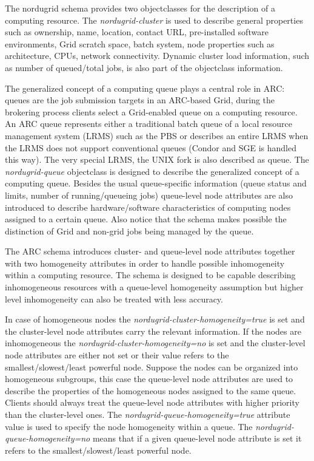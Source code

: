 \documentclass{article}
\begin{document}
The nordugrid schema provides two objectclasses for the description of 
a computing resource. The {\it nordugrid-cluster} is used to describe 
general properties such as ownership, name, location, contact URL, 
pre-installed software environments, Grid scratch space, batch system,
node properties such as architecture, CPUs, network connectivity. 
Dynamic cluster load information, such as number of queued/total jobs, 
is also part of the objectclass information.

The generalized concept of a 
computing queue plays a central role in ARC:
queues are the job submission targets in an ARC-based Grid, during the brokering
process clients select a Grid-enabled queue on a computing resource.
An ARC queue represents either a traditional batch queue of a local resource management
system (LRMS) such as the PBS or describes an entire LRMS when the 
LRMS does not support conventional queues
(Condor and SGE is handled this way). The very special  LRMS, the UNIX fork
is also described as queue. 
The {\it nordugrid-queue} objectclass is designed to describe the generalized concept of
a computing queue. Besides the usual queue-specific information (queue status
and limits, number of running/queueing jobs)  queue-level node attributes are also 
introduced to describe hardware/software 
characteristics of computing nodes assigned to a certain queue.  
Also notice that the schema makes possible the 
distinction of Grid and non-grid jobs being managed by the queue.


The ARC schema introduces cluster- and queue-level node attributes
together with two homogeneity attributes
in order to handle possible inhomogeneity within a computing resource.
The schema is designed to be capable describing inhomogeneous resources with a
queue-level homogeneity assumption but higher level inhomogeneity
can also be treated with less accuracy.

In case of homogeneous nodes the {\it nordugrid-cluster-homogeneity=true}
is set and the cluster-level node attributes carry the relevant information.
If the nodes are inhomogeneous the {\it nordugrid-cluster-homogeneity=no}
is set and the cluster-level node attributes are either not set or
their value refers to the smallest/slowest/least powerful node.
Suppose the nodes can be organized into homogeneous subgroups, 
this case the queue-level node attributes are used to 
describe the properties of the homogeneous nodes
assigned to the same queue. Clients should always treat the 
queue-level node attributes with higher priority than the 
cluster-level ones. The {\it nordugrid-queue-homogeneity=true}
attribute value is used to specify the node homogeneity within a queue.
The {\it nordugrid-queue-homogeneity=no} means that if 
a given queue-level node attribute is set it
refers to the smallest/slowest/least powerful node.
\end{document}
